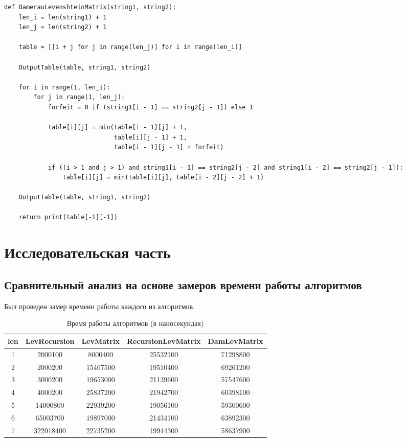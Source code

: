 \documentclass[12pt]{report}
\begin{document}
\newpage
\begin{lstlisting}[label=some-code,caption=Функция нахождения расстояния Дамерау-Левенштейна матрично]
def DamerauLevenshteinMatrix(string1, string2):
    len_i = len(string1) + 1
    len_j = len(string2) + 1

    table = [[i + j for j in range(len_j)] for i in range(len_i)]

    OutputTable(table, string1, string2)

    for i in range(1, len_i):
        for j in range(1, len_j):
            forfeit = 0 if (string1[i - 1] == string2[j - 1]) else 1

            table[i][j] = min(table[i - 1][j] + 1,
                              table[i][j - 1] + 1,
                              table[i - 1][j - 1] + forfeit)

            if ((i > 1 and j > 1) and string1[i - 1] == string2[j - 2] and string1[i - 2] == string2[j - 1]):
                table[i][j] = min(table[i][j], table[i - 2][j - 2] + 1)

    OutputTable(table, string1, string2)

    return print(table[-1][-1])
\end{lstlisting}


\chapter{Исследовательская часть}

\section{Сравнительный анализ на основе замеров времени работы алгоритмов}

Был проведен замер времени работы каждого из алгоритмов.


\begin{table} [h!]
\caption{Время работы алгоритмов (в наносекундах)}
	\begin{tabular}{|c c c c c|} 
 	\hline
	len & LevRecursion & LevMatrix & RecursionLevMatrix & DamLevMatrix \\ [0.8ex] 
 	\hline\hline
 	1 & 2000100 & 8000400 & 25532100 & 71298800\\
 	\hline
 	2 & 2000200 & 15467500 & 19510400 & 69261200\\
 	\hline
	3 & 3000200 & 19653000 & 21139600 & 57547600\\
	\hline
	4 & 4000200 & 25837200 & 21942700 & 60398100\\
	\hline
	5 & 14000800 & 22939200 & 19056100 & 59300600\\
	\hline
	6 & 65003700 & 19897000 & 21434100 & 63892300\\
	\hline
	7 & 322018400 & 22735200 & 19944300 & 58637900\\
	\hline
	\end{tabular}
\end{table}
\end{document}
